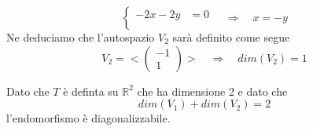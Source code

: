 \begin{example}
\begin{itemize}
		      \[
			      \begin{cases}
				      -2x - 2y & = 0 \\
			      \end{cases} \quad \Rightarrow \quad
			      x = -y
		      \]
		      Ne deduciamo che l'autospazio $V_2$ sar\`a definito come segue 
		      \[
			      V_2 = < \begin{pmatrix} -1 \\ 1 \end{pmatrix} > \quad \Rightarrow \quad
			      dim(V_2) = 1
		      \]
	\end{itemize}
	Dato che $T$ \`e definta su $\mathbb{R}^2$ che ha dimensione 2 e dato che 
	\[ dim(V_1) + dim(V_2) = 2 \] l'endomorfismo \`e diagonalizzabile.
\end{example}